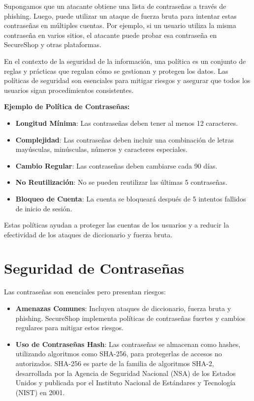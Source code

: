 Supongamos que un atacante obtiene una lista de contraseñas a través de phishing. Luego, puede utilizar un ataque de fuerza bruta para intentar estas contraseñas en múltiples cuentas. Por ejemplo, si un usuario utiliza la misma contraseña en varios sitios, el atacante puede probar esa contraseña en SecureShop y otras plataformas.



En el contexto de la seguridad de la información, una política es un conjunto de reglas y prácticas que regulan cómo se gestionan y protegen los datos. Las políticas de seguridad son esenciales para mitigar riesgos y asegurar que todos los usuarios sigan procedimientos consistentes.

\textbf{Ejemplo de Política de Contraseñas:}
\begin{itemize}
    \item \textbf{Longitud Mínima}: Las contraseñas deben tener al menos 12 caracteres.
    \item \textbf{Complejidad}: Las contraseñas deben incluir una combinación de letras mayúsculas, minúsculas, números y caracteres especiales.
    \item \textbf{Cambio Regular}: Las contraseñas deben cambiarse cada 90 días.
    \item \textbf{No Reutilización}: No se pueden reutilizar las últimas 5 contraseñas.
    \item \textbf{Bloqueo de Cuenta}: La cuenta se bloqueará después de 5 intentos fallidos de inicio de sesión.
\end{itemize}

Estas políticas ayudan a proteger las cuentas de los usuarios y a reducir la efectividad de los ataques de diccionario y fuerza bruta.














\section{Seguridad de Contraseñas}
Las contraseñas son esenciales pero presentan riesgos:

\begin{itemize}
    \item \textbf{Amenazas Comunes}: Incluyen ataques de diccionario, fuerza bruta y phishing. SecureShop implementa políticas de contraseñas fuertes y cambios regulares para mitigar estos riesgos.
    \item \textbf{Uso de Contraseñas Hash}: Las contraseñas se almacenan como hashes, utilizando algoritmos como SHA-256, para protegerlas de accesos no autorizados. SHA-256 es parte de la familia de algoritmos SHA-2, desarrollada por la Agencia de Seguridad Nacional (NSA) de los Estados Unidos y publicada por el Instituto Nacional de Estándares y Tecnología (NIST) en 2001. 
\end{itemize}






